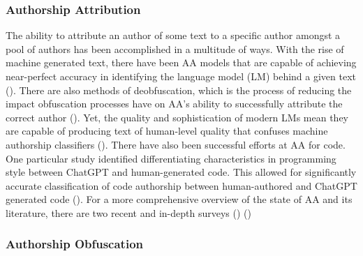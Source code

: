 \documentclass{article}
\begin{document}
\subsubsection{Authorship Attribution
}
The ability to attribute an author of some text to a specific author amongst a pool of authors has been accomplished in a multitude of ways. With the rise of machine generated text, there have been AA models that are capable of achieving near-perfect accuracy in identifying the language model (LM) behind a given text (\cite{Munir2021-yt}). There are also methods of deobfuscation, which is the process of reducing the impact obfuscation processes have on AA's ability to successfully attribute the correct author (\cite{Zhai2022-pc}).  Yet, the quality and sophistication of modern LMs mean they are capable of producing text of human-level quality that confuses machine authorship classifiers (\cite{Uchendu2020-nk}). There have also been successful efforts at AA for code. One particular study identified differentiating characteristics in programming style between ChatGPT and human-generated code. This allowed for significantly accurate classification of code authorship between human-authored and ChatGPT generated code (\cite{Ke2023-nl}).
For a more comprehensive overview of the state of AA and its literature, there are two recent and in-depth surveys (\cite{Uchendu2022-in}) (\cite{Zheng2023-pn})

\subsubsection{Authorship Obfuscation}
\end{document}
